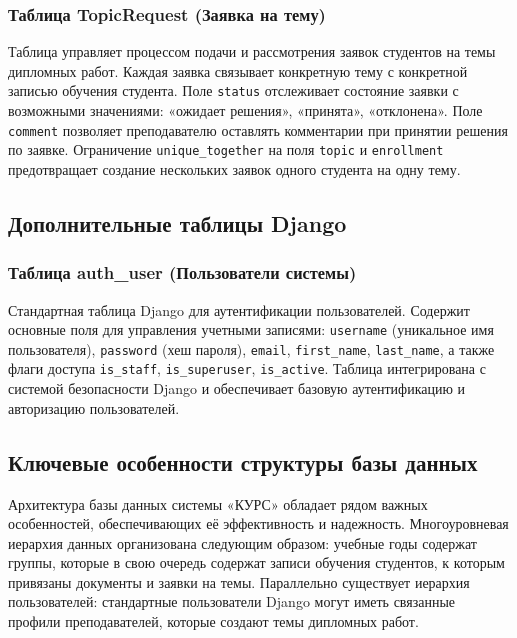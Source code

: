 \documentclass[a4paper,12pt]{article}
\begin{document}
\subsubsection{Таблица TopicRequest (Заявка на тему)}

Таблица управляет процессом подачи и рассмотрения заявок студентов на темы дипломных работ. Каждая заявка связывает конкретную тему с конкретной записью обучения студента. Поле \texttt{status} отслеживает состояние заявки с возможными значениями: «ожидает решения», «принята», «отклонена». Поле \texttt{comment} позволяет преподавателю оставлять комментарии при принятии решения по заявке. Ограничение \texttt{unique\_together} на поля \texttt{topic} и \texttt{enrollment} предотвращает создание нескольких заявок одного студента на одну тему.

\subsection{Дополнительные таблицы Django}

\subsubsection{Таблица auth\_user (Пользователи системы)}

Стандартная таблица Django для аутентификации пользователей. Содержит основные поля для управления учетными записями: \texttt{username} (уникальное имя пользователя), \texttt{password} (хеш пароля), \texttt{email}, \texttt{first\_name}, \texttt{last\_name}, а также флаги доступа \texttt{is\_staff}, \texttt{is\_superuser}, \texttt{is\_active}. Таблица интегрирована с системой безопасности Django и обеспечивает базовую аутентификацию и авторизацию пользователей.

\subsection{Ключевые особенности структуры базы данных}

Архитектура базы данных системы «КУРС» обладает рядом важных особенностей, обеспечивающих её эффективность и надежность. Многоуровневая иерархия данных организована следующим образом: учебные годы содержат группы, которые в свою очередь содержат записи обучения студентов, к которым привязаны документы и заявки на темы. Параллельно существует иерархия пользователей: стандартные пользователи Django могут иметь связанные профили преподавателей, которые создают темы дипломных работ.
\end{document}
